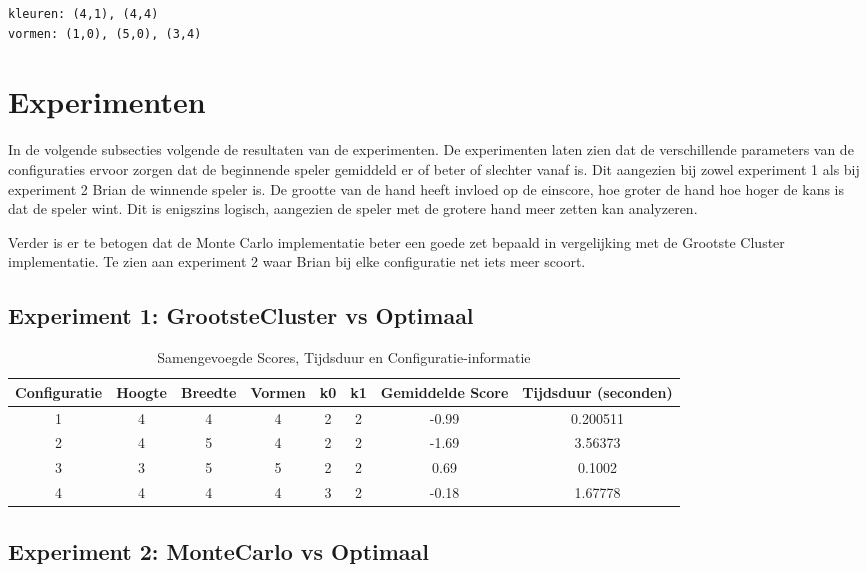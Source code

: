 \documentclass[10pt]{article}
\begin{document}
\begin{verbatim}
kleuren: (4,1), (4,4)
vormen: (1,0), (5,0), (3,4)
\end{verbatim}
 

\section{Experimenten}
In de volgende subsecties volgende de resultaten van de experimenten.
De experimenten laten zien dat de verschillende parameters van de configuraties ervoor zorgen dat de beginnende speler gemiddeld er of beter of slechter vanaf is.
Dit aangezien bij zowel experiment 1 als bij experiment 2 Brian de winnende speler is.
De grootte van de hand heeft invloed op de einscore, hoe groter de hand hoe hoger de kans is dat de speler wint.
Dit is enigszins logisch, aangezien de speler met de grotere hand meer zetten kan analyzeren.

Verder is er te betogen dat de Monte Carlo implementatie beter een goede zet bepaald in vergelijking met de Grootste Cluster implementatie. 
Te zien aan experiment 2 waar Brian bij elke configuratie net iets meer scoort.

\subsection{Experiment 1: GrootsteCluster vs Optimaal}

\begin{table}[h]
    \centering
    \caption{Samengevoegde Scores, Tijdsduur en Configuratie-informatie}
    \begin{tabular}{@{}cccccccc@{}}
        \toprule
        Configuratie & Hoogte & Breedte & Vormen & k0 & k1 & Gemiddelde Score & Tijdsduur (seconden) \\ 
        \midrule
        1 & 4 & 4 & 4 & 2 & 2 & -0.99 & 0.200511 \\
        2 & 4 & 5 & 4 & 2 & 2 & -1.69 & 3.56373 \\
        3 & 3 & 5 & 5 & 2 & 2 & 0.69 & 0.1002 \\
        4 & 4 & 4 & 4 & 3 & 2 & -0.18 & 1.67778 \\ 
        \bottomrule
    \end{tabular}
\end{table}
\FloatBarrier

\subsection{Experiment 2: MonteCarlo vs Optimaal}
\end{document}
